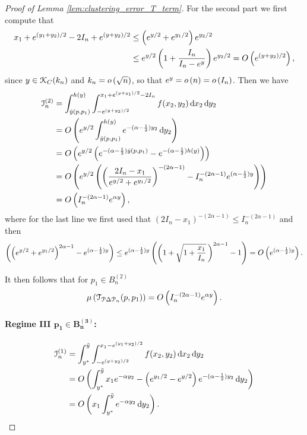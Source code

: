 \begin{proof}[Proof of Lemma \ref{lem:clustering_error_T_term}]
For the second part we first compute that 
\begin{align*}
	x_1 + e^{(y_1+y_2)/2} - 2 I_n + e^{(y + y_2)/2} &\le \left(e^{y/2} + e^{y_1/2}\right)e^{y_2/2}\\
	&\le e^{y/2}\left(1 + \frac{I_n}{I_n - e^y}\right)e^{y_2/2} = O\left(e^{(y+y_2)/2}\right),
\end{align*}
since $y \in {\mathcal K}_{C}(k_n)$ and $k_n = o\left(\sqrt{n}\right)$, so that $e^y = o\left(n\right) = o\left(I_n\right)$. 
Then we have
\begin{align*}
	\mathcal{I}_n^{(2)} &= \int_{\hat{y}(p,p_1)}^{h(y)} \int_{-e^{(y + y_2)/2}}^{x_1 + e^{(y+y_1)/2} - 2 I_n} 
		f(x_2, y_2) \operatorname{\mathrm{d}\hspace{-2pt}} x_2 \operatorname{\mathrm{d}\hspace{-2pt}} y_2\\
	&= O\left(e^{y/2} \int_{\hat{y}(p,p_1)}^{h(y)} e^{-(\alpha -\frac{1}{2}) y_2} \operatorname{\mathrm{d}\hspace{-2pt}} y_2\right)\\
	&= O\left(e^{y/2} \left(e^{-(\alpha -\frac{1}{2}) \hat{y}(p,p_1)} - e^{-(\alpha -\frac{1}{2}) h(y)}\right)\right)\\
	&= O\left(e^{y/2} \left(\left(\frac{2I_n - x_1}{e^{y/2} + e^{y_1/2}}\right)^{-(2\alpha-1)} 
		- I_n^{-(2\alpha-1)} e^{(\alpha -\frac{1}{2}) y}\right)\right)\\
	&= O\left(I_n^{-(2\alpha-1)} e^{\alpha y}\right),
\end{align*}
where for the last line we first used that $(2I_n - x_1)^{-(2\alpha-1)} \le I_n^{-(2\alpha-1)}$ and then
\[
	\left(\left(e^{y/2} + e^{y_1/2}\right)^{2\alpha-1}- e^{(\alpha -\frac{1}{2}) y}\right)
	\le e^{(\alpha -\frac{1}{2}) y}\left(\left(1 + \sqrt{1+\frac{x_1}{I_n}} \, \right)^{2\alpha - 1} - 1\right)
	= O\left(e^{(\alpha -\frac{1}{2}) y}\right).
\]

It then follows that for $p_1 \in B_n^{(2)}$
\[
	\mu\left(\mathcal{T}_{{\mathcal P} \Delta {\mathcal P}_n}(p,p_1)\right) = O\left(I_n^{-(2\alpha-1)} e^{\alpha y}\right).
\]

\paragraph{Regime III $\bm{p_1 \in B_n^{(3)}}$:}

\begin{align*}
	\mathcal{I}_n^{(1)} &= \int_{y^\ast}^{\tilde{y}} \int_{-e^{(y+y_2)/2}}^{x_1-e^{(y_1+y_2)/2}} f(x_2,y_2)
		\operatorname{\mathrm{d}\hspace{-2pt}} x_2 \operatorname{\mathrm{d}\hspace{-2pt}} y_2\\
	&= O\left(\int_{y^\ast}^{\tilde{y}} x_1 e^{-\alpha y_2} - \left(e^{y_1/2} - e^{y/2}\right)e^{-(\alpha - \frac{1}{2})y_2}
		\operatorname{\mathrm{d}\hspace{-2pt}} y_2\right)\\
	&= O\left(x_1 \int_{y^\ast}^{\tilde{y}}  e^{-\alpha y_2} \operatorname{\mathrm{d}\hspace{-2pt}} y_2\right).
\end{align*}


\end{proof}
